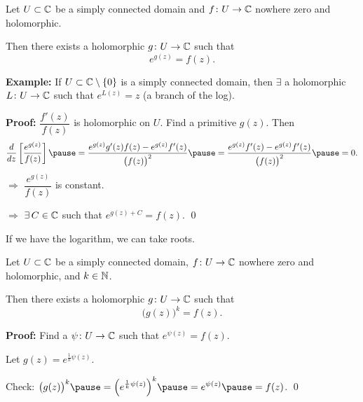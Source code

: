 \documentclass[10pt,aspectratio=169]{beamer}
\begin{document}
\begin{frame}
\begin{corollary}
Let $U \subset {\mathbb{C}}$ be a simply connected domain and
$f \colon U \to {\mathbb{C}}$ nowhere zero and holomorphic.

\pause
Then there exists a holomorphic $g \colon U \to {\mathbb{C}}$
such that
\[
e^{g(z)} = f(z) .
\]
\end{corollary}

\pause

\textbf{Example:}
If $U \subset {\mathbb{C}} \setminus \{ 0 \}$ is a simply connected domain, then
$\exists$ a holomorphic
$L \colon U \to {\mathbb{C}}$ such that
$e^{L(z)} = z$ (a branch of the log).

\medskip
\pause

\textbf{Proof:}
$\dfrac{f'(z)}{f(z)}$ is holomorphic on $U$.  \pause Find a primitive $g(z)$.
\pause
Then
\[
\frac{d}{dz} \left[ \frac{e^{g(z)}}{f(z)} \right]
\pause =
\frac{ e^{g(z)} g'(z) f(z) - e^{g(z)} f'(z) }{{\bigl(f(z)\bigr)}^2}
\pause =
\frac{ e^{g(z)} f'(z) - e^{g(z)} f'(z) }{{\bigl(f(z)\bigr)}^2}
\pause =
0 .
\]
\pause
$\Rightarrow$ \quad $\dfrac{e^{g(z)}}{f(z)}$ is constant.

\medskip
\pause

$\Rightarrow$ \quad $\exists \, C \in {\mathbb{C}}$ such that
$e^{g(z) + C} = f(z)$.
\qed

\end{frame}

\begin{frame}

If we have the logarithm, we can take roots.

\pause

\begin{corollary}
Let $U \subset {\mathbb{C}}$ be a simply connected domain,
$f \colon U \to {\mathbb{C}}$ nowhere zero and holomorphic,
and $k \in {\mathbb{N}}$.

\pause
Then there exists a holomorphic $g \colon U \to {\mathbb{C}}$
such that
\[
{\bigl(g(z)\bigr)}^k = f(z) .
\]
\end{corollary}

\pause

\textbf{Proof:}
Find a $\psi \colon U \to {\mathbb{C}}$ such that $e^{\psi(z)} = f(z)$. 

\medskip
\pause

Let $g(z) = e^{\frac{1}{k} \psi(z)}$.

\medskip
\pause

Check:
\qquad
$\displaystyle
{\bigl(g(z)\bigr)}^k
\pause
=
{\left( e^{\frac{1}{k} \psi(z)} \right)}^k
\pause
=
e^{\psi(z)} \pause = f(z)$. \qed

\end{frame}
\end{document}
